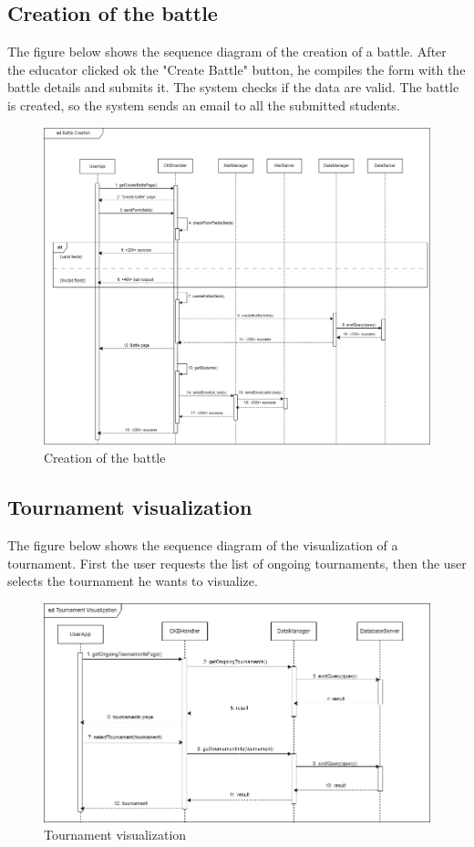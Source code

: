 \subsection{Creation of the battle}
The figure below shows the sequence diagram of the creation of a battle. After the educator clicked ok the "Create Battle" button, he compiles the form
 with the battle details and submits it. The system checks if the data are valid. The battle is created, so the system sends an email to all 
 the submitted students.  
 
\begin{figure}[H]
    \centering
    \includegraphics[width=1\textwidth]{images/seq_diagrams/battle_creation_DD.png}
    \caption{Creation of the battle}
\end{figure}
\clearpage

\subsection{Tournament visualization}
The figure below shows the sequence diagram of the visualization of a tournament. First the user requests the list of ongoing tournaments, 
then the user selects the tournament he wants to visualize.\\
\begin{figure}[H]
    \centering
    \includegraphics[width=1\textwidth]{images/seq_diagrams/tournament_visualization_dd.png}
    \caption{Tournament visualization}
\end{figure}
\clearpage

